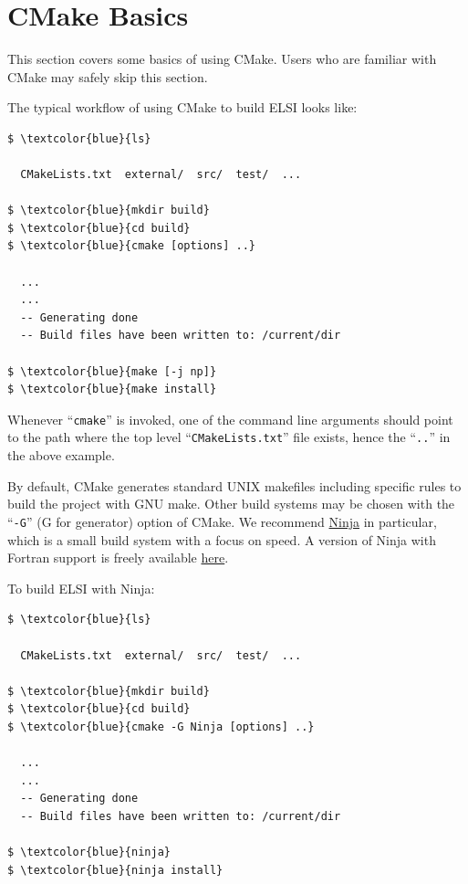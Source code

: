\documentclass{report}
\begin{document}
\section{CMake Basics}
\label{sec:cmake}
This section covers some basics of using CMake. Users who are familiar with CMake may safely skip this section.

The typical workflow of using CMake to build ELSI looks like:
\begin{tcolorbox}
\begin{Verbatim}[commandchars=\\\{\}]
$ \textcolor{blue}{ls}

  CMakeLists.txt  external/  src/  test/  ...

$ \textcolor{blue}{mkdir build}
$ \textcolor{blue}{cd build}
$ \textcolor{blue}{cmake [options] ..}

  ...
  ...
  -- Generating done
  -- Build files have been written to: /current/dir

$ \textcolor{blue}{make [-j np]}
$ \textcolor{blue}{make install}
\end{Verbatim}
\end{tcolorbox}

Whenever ``\verb+cmake+'' is invoked, one of the command line arguments should point to the path where the top level ``\verb+CMakeLists.txt+'' file exists, hence the ``\verb+..+'' in the above example.

By default, CMake generates standard UNIX makefiles including specific rules to build the project with GNU make. Other build systems may be chosen with the ``\verb+-G+'' (G for generator) option of CMake. We recommend \href{http://ninja-build.org}{Ninja} in particular, which is a small build system with a focus on speed. A version of Ninja with Fortran support is freely available \href{http://github.com/Kitware/ninja}{here}.

To build ELSI with Ninja:
\begin{tcolorbox}
\begin{Verbatim}[commandchars=\\\{\}]
$ \textcolor{blue}{ls}

  CMakeLists.txt  external/  src/  test/  ...

$ \textcolor{blue}{mkdir build}
$ \textcolor{blue}{cd build}
$ \textcolor{blue}{cmake -G Ninja [options] ..}

  ...
  ...
  -- Generating done
  -- Build files have been written to: /current/dir

$ \textcolor{blue}{ninja}
$ \textcolor{blue}{ninja install}
\end{Verbatim}
\end{tcolorbox}
\end{document}
